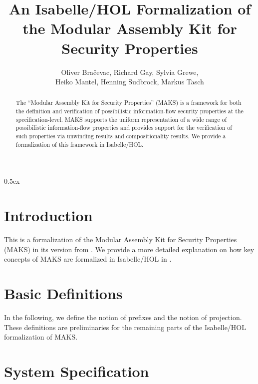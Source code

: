 \documentclass[10pt,a4paper]{article}
\date{}
\begin{document}
\title{An Isabelle/HOL Formalization of the Modular Assembly Kit for Security Properties}
\author{Oliver Bra\v{c}evac, Richard Gay, Sylvia Grewe,\\ Heiko Mantel, Henning Sudbrock, Markus Tasch}
\maketitle

\begin{abstract}
	The \enquote{Modular Assembly Kit for Security Properties} (MAKS) is a
	framework for both the definition and verification of possibilistic
	information-flow security properties at the specification-level. 
	MAKS supports the uniform representation of a wide range of
	possibilistic information-flow properties and provides support for the
	verification of such properties via unwinding results and compositionality
	results. We provide a formalization of this framework in Isabelle/HOL. 
\end{abstract}

\tableofcontents
\newpage

\parindent 0pt\parskip 0.5ex

%

\section{Introduction}

This is a formalization of the Modular Assembly Kit for Security Properties (MAKS) {\cite{inp:Mantel2000a,phd:Mantel2003}} in its version from {\cite{phd:Mantel2003}}. We provide a more detailed explanation on how key concepts of MAKS are formalized in Isabelle/HOL in {\cite{tr:GreweMantelTaschGaySudbrock2018a}}.

\section{Basic Definitions}
In the following, we define the notion of prefixes and the notion of projection.
These definitions are preliminaries for the remaining parts of the Isabelle/HOL formalization of MAKS.\\





\section{System Specification}
\end{document}
